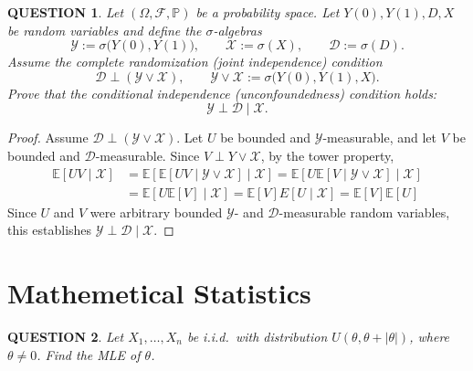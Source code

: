\documentclass[12pt]{article}
\renewcommand{\(}{\left(}%
\renewcommand{\)}{\right)}%
\renewcommand{\[}{\left[}%
\renewcommand{\]}{\right]}%
\newtheorem{question}{QUESTION}[section]}
\newtheorem{proof}{Proof.}}
\begin{document}
\begin{question}
Let $(\Omega,\mathcal F,\mathbb P)$ be a probability space. Let $Y(0),Y(1),D,X$ be random variables and define the $\sigma$-algebras
\begin{equation*}
\mathcal Y := \sigma\bigl(Y(0),Y(1)\bigr),\qquad
\mathcal X := \sigma(X),\qquad
\mathcal D := \sigma(D).
\end{equation*}
Assume the \emph{complete randomization} (joint independence) condition
\begin{equation*}
\mathcal D \perp (\mathcal Y \vee \mathcal X),
\qquad
\mathcal Y \vee \mathcal X := \sigma\bigl(Y(0),Y(1),X\bigr).
\end{equation*}
Prove that the \emph{conditional independence} (unconfoundedness) condition holds:
\begin{equation*}
\mathcal Y \perp \mathcal D \mid \mathcal X.
\end{equation*}
\end{question}

\begin{proof}
Assume $\mathcal D \perp (\mathcal Y\vee \mathcal X)$. Let $U$ be bounded and $\mathcal Y$-measurable, and let $V$ be bounded and $\mathcal D$-measurable. Since $V\perp Y\vee \mathcal X$,  by the tower property,
\begin{equation*}
\begin{split}
	\mathbb E[UV\mid \mathcal X]
&=
\mathbb E\!\left[\mathbb E[UV\mid \mathcal Y\vee \mathcal X]\mid \mathcal X\right]=\mathbb E\!\left[U\mathbb E[V\mid \mathcal Y\vee \mathcal X]\mid \mathcal X\right]\\
&=\mathbb E\!\left[U\mathbb E[V]\mid \mathcal X\right]=\mathbb E[V]E[U\mid \mathcal X]=\mathbb E[V]\mathbb E[U]
\end{split}
\end{equation*}
Since $U$ and $V$ were arbitrary bounded $\mathcal Y$- and $\mathcal D$-measurable random variables, this establishes $\mathcal Y \perp \mathcal D \mid \mathcal X$.
\end{proof}

\section{Mathemetical Statistics}

\begin{question}
Let $X_1,\ldots,X_n$ be i.i.d.\ with distribution $U(\theta,\theta+|\theta|)$, where $\theta\neq 0$.
Find the MLE of $\theta$.
\end{question}
\end{document}
